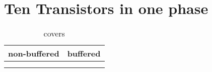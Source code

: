 \section{Ten Transistors in one phase}

\begin{table}[ht]
\centering
\caption*{covers}

\begin{tabular}{cc}
    \toprule
    non-buffered & buffered \\
    \midrule

    \nameref{cell:NAND5} & \nameref{cell:AND5} \\
    \nameref{cell:NOR5} & \nameref{cell:OR5}

\end{tabular}

\end{table}

 
 
